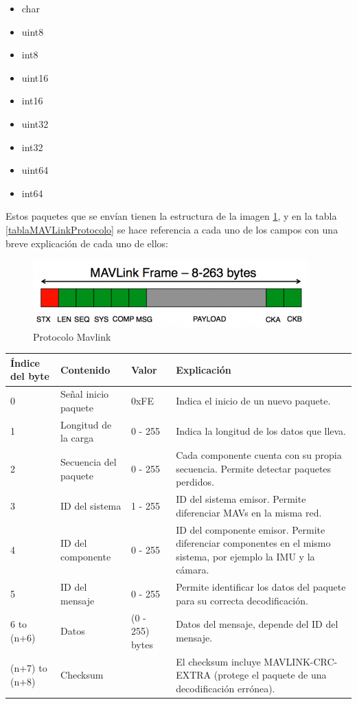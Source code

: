 \begin{multicols}{3}
\begin{itemize}
\item char
\item uint8
\item int8
\item uint16
\item int16
\item uint32
\item int32
\item uint64
\item int64
\end{itemize}
\end{multicols}

Estos paquetes que se envían tienen la estructura de la imagen \ref{fig:protocoloMavlink}, y en la tabla \ref{tablaMAVLinkProtocolo} se hace referencia a cada uno de los campos con una breve explicación de cada uno de ellos:

\clearpage
\begin{figure}[H]
  \centering
  \includegraphics[scale=0.65]{imagenes/protocoloMavLink.png}
  \caption{Protocolo Mavlink}
  \label{fig:protocoloMavlink}
\end{figure}

\begin{center}
	\label{tablaMAVLinkProtocolo}
    \begin{tabular}{ | p{2cm} | p{2cm} | p{3cm} | p{5cm} |}
    \hline
    Índice del byte & Contenido & Valor & Explicación \\ \hline
    0 & Señal inicio paquete & 0xFE  & Indica el inicio de un nuevo paquete. \\ \hline
     1 & Longitud de la carga	& 0 - 255 & Indica la longitud de los datos que lleva. \\ \hline
     2 & Secuencia del paquete & 0 - 255 & Cada componente cuenta con su propia secuencia. Permite detectar paquetes perdidos. \\
    \hline
    3 & ID del sistema & 1 - 255 & ID del sistema emisor. Permite diferenciar MAVs en la misma red. \\
    \hline
    4 & ID del componente & 0 - 255	& ID del componente emisor. Permite diferenciar componentes en el mismo sistema, por ejemplo la IMU y la cámara.\\
    \hline
    5 & ID del mensaje	& 0 - 255 & Permite identificar los datos del paquete para su correcta decodificación.\\
    \hline
     6 to (n+6)  & Datos	& (0 - 255) bytes & Datos del mensaje, depende del ID del mensaje.\\
    \hline
   	(n+7) to (n+8) & Checksum &  & El checksum  incluye MAVLINK-CRC-EXTRA (protege el paquete de una decodificación errónea). \\ 
    \hline
    \end{tabular}
\end{center}
\cleardoublepage